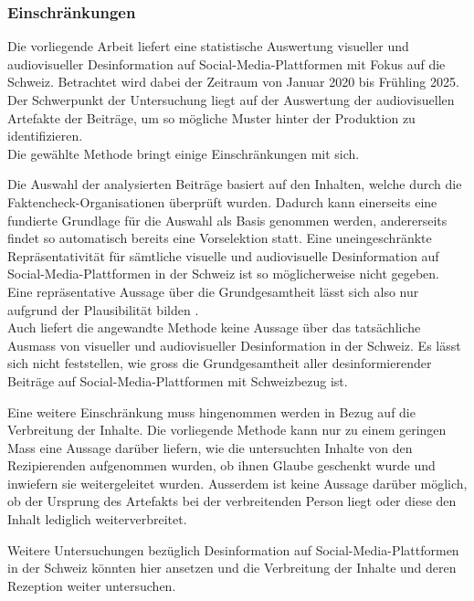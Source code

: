 \documentclass[12pt,a4paper]{article}        %
\begin{document}
\subsubsection{Einschränkungen}
Die vorliegende Arbeit liefert eine statistische Auswertung visueller und audiovisueller Desinformation auf Social-Media-Plattformen mit Fokus auf die Schweiz. Betrachtet wird dabei der Zeitraum von Januar 2020 bis Frühling 2025. Der Schwerpunkt der Untersuchung liegt auf der Auswertung der audiovisuellen Artefakte der Beiträge, um so mögliche Muster hinter der Produktion zu identifizieren. \\
Die gewählte Methode bringt einige Einschränkungen mit sich.

Die Auswahl der analysierten Beiträge basiert auf den Inhalten, welche durch die Faktencheck-Organisationen überprüft wurden. Dadurch kann einerseits eine fundierte Grundlage für die Auswahl als Basis genommen werden, andererseits findet so automatisch bereits eine Vorselektion statt. Eine uneingeschränkte Repräsentativität für sämtliche visuelle und audiovisuelle Desinformation auf Social-Media-Plattformen in der Schweiz ist so möglicherweise nicht gegeben. Eine repräsentative Aussage über die Grundgesamtheit lässt sich also nur aufgrund der Plausibilität bilden \parencite[vgl.\ dazu auch][12]{oehmer-pedrazzi_standardisierte_2023}.
\\ Auch liefert die angewandte Methode keine Aussage über das tatsächliche Ausmass von visueller und audiovisueller Desinformation in der Schweiz. Es lässt sich nicht feststellen, wie gross die Grundgesamtheit aller desinformierender Beiträge auf Social-Media-Plattformen mit Schweizbezug ist.

Eine weitere Einschränkung muss hingenommen werden in Bezug auf die Verbreitung der Inhalte. Die vorliegende Methode kann nur zu einem geringen Mass eine Aussage darüber liefern, wie die untersuchten Inhalte von den Rezipierenden aufgenommen wurden, ob ihnen Glaube geschenkt wurde und inwiefern sie weitergeleitet wurden. Ausserdem ist keine Aussage darüber möglich, ob der Ursprung des Artefakts bei der verbreitenden Person liegt oder diese den Inhalt lediglich weiterverbreitet.

Weitere Untersuchungen bezüglich Desinformation auf Social-Media-Plattformen in der Schweiz könnten hier ansetzen und die Verbreitung der Inhalte und deren Rezeption weiter untersuchen.
\end{document}
